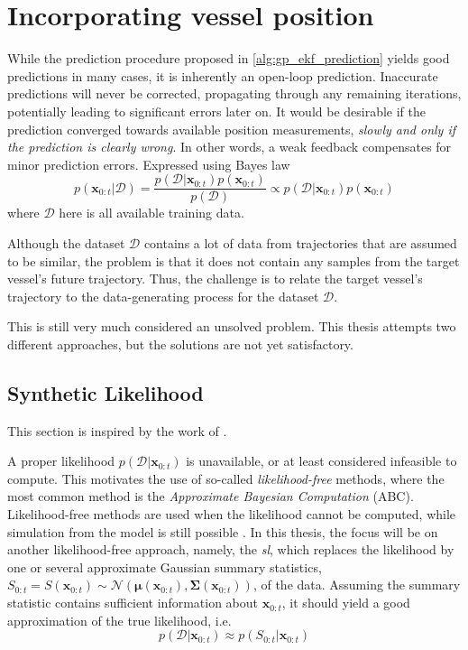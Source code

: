 \section{Incorporating vessel position}
While the prediction procedure proposed in \cref{alg:gp_ekf_prediction} yields good predictions in many cases, it is inherently an open-loop prediction. Inaccurate predictions will never be corrected, propagating through any remaining iterations, potentially leading to significant errors later on.  It would be desirable if the prediction converged towards available position measurements, \textit{slowly and only if the prediction is clearly wrong}. In other words, a weak feedback compensates for minor prediction errors. Expressed using Bayes law
\begin{equation}\label{eq:gp_ekf_update_posterior}
    p(\boldsymbol{x}_{0:t} | \mathcal{D}) = \frac{p(\mathcal{D} | \boldsymbol{x}_{0:t}) p(\boldsymbol{x}_{0:t})}{p(\mathcal{D})} \propto p(\mathcal{D} | \boldsymbol{x}_{0:t})p(\boldsymbol{x}_{0:t})
\end{equation}
where $\mathcal{D}$ here is all available training data.

Although the dataset $\mathcal{D}$ contains a lot of data from trajectories that are assumed to be similar, the problem is that it does not contain any samples from the target vessel's future trajectory. Thus, the challenge is to relate the target vessel's trajectory to the data-generating process for the dataset $\mathcal{D}$.

This is still very much considered an unsolved problem. This thesis attempts two different approaches, but the solutions are not yet satisfactory.

\subsection{Synthetic Likelihood}
This section is inspired by the work of \citeauthor{praveen-syn} \cite{praveen-syn}.

A proper likelihood $p(\mathcal{D} | \boldsymbol{x}_{0:t})$ is unavailable, or at least considered infeasible to compute. This motivates the use of so-called \textit{likelihood-free} methods, where the most common method is the \textit{Approximate Bayesian Computation} (ABC). Likelihood-free methods are used when the likelihood cannot be computed, while simulation from the model is still possible \cite{likelihood_free,frazier2021bayesian}. In this thesis, the focus will be on another likelihood-free approach, namely, the \textit{\acrfull{sl}}, which replaces the likelihood by one or several approximate Gaussian summary statistics, $S_{0:t} = S(\boldsymbol{x}_{0:t}) \sim \mathcal{N}(\boldsymbol{\mu}(\boldsymbol{x}_{0:t}), \boldsymbol{\Sigma}(\boldsymbol{x}_{0:t}))$, of the data. Assuming the summary statistic contains sufficient information about $\boldsymbol{x}_{0:t}$, it should yield a good approximation of the true likelihood, i.e.
\begin{equation}
    p(\mathcal{D} | \boldsymbol{x}_{0:t}) \approx p(S_{0:t} | \boldsymbol{x}_{0:t})
\end{equation}


